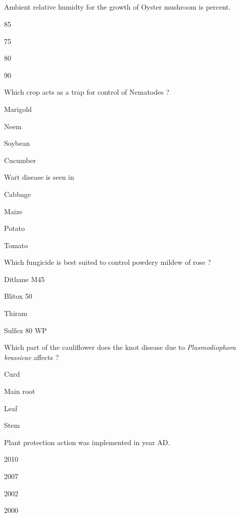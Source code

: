 
\subsection*{}

\begin{questions}

\question Ambient relative humidty for the growth of Oyster mushroom is \fillin[][3cm] percent.
\begin{items}
\item* 85
\item 75
\item 80
\item 90
\end{items}

\question Which crop acts as a trap for control of Nematodes ?
\begin{items}
\item* Marigold
\item Neem
\item Soybean
\item Cucumber
\end{items}

\question Wart disease is seen in
\begin{items}
\item Cabbage
\item Maize
\item* Potato
\item Tomato
\end{items}

\question Which fungicide is best suited to control powdery mildew of rose ?
\begin{items}
\item Dithane M45
\item Blitox 50
\item Thiram
\item* Sulfex 80 WP
\end{items}

\question Which part of the cauliflower does the knot disease due to \textit{Plasmodiophora brassicae} affects ?
\begin{items}
\item Curd
\item* Main root
\item Leaf
\item Stem
\end{items}

\question Plant protection action was implemented in year \fillin[][3cm] AD.
\begin{items}
\item 2010
\item* 2007
\item 2002
\item 2000
\end{items}


\end{questions}
